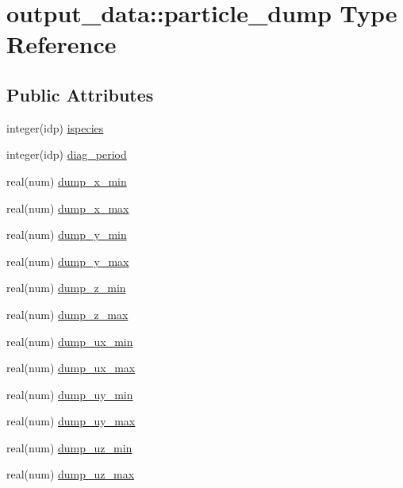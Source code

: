 \hypertarget{structoutput__data_1_1particle__dump}{}\section{output\+\_\+data\+:\+:particle\+\_\+dump Type Reference}
\label{structoutput__data_1_1particle__dump}
\subsection*{Public Attributes}
\begin{DoxyCompactItemize}
\item 
integer(idp) \hyperlink{structoutput__data_1_1particle__dump_add7490b6251f083595a221bead55a798}{ispecies}
\item 
integer(idp) \hyperlink{structoutput__data_1_1particle__dump_a2518cae3f0b8514002607d4c3848dbb7}{diag\+\_\+period}
\item 
real(num) \hyperlink{structoutput__data_1_1particle__dump_a79d5cc9dd03bf1aa1c49e864014fb87b}{dump\+\_\+x\+\_\+min}
\item 
real(num) \hyperlink{structoutput__data_1_1particle__dump_a810ba7ca647efaef4413e113755d922a}{dump\+\_\+x\+\_\+max}
\item 
real(num) \hyperlink{structoutput__data_1_1particle__dump_a4de965e6028bcd3bf64aa18e54e2603f}{dump\+\_\+y\+\_\+min}
\item 
real(num) \hyperlink{structoutput__data_1_1particle__dump_af9d54f7e6f448279ee61cf1ca25cf8df}{dump\+\_\+y\+\_\+max}
\item 
real(num) \hyperlink{structoutput__data_1_1particle__dump_a645012e22acb2681967acead28536d90}{dump\+\_\+z\+\_\+min}
\item 
real(num) \hyperlink{structoutput__data_1_1particle__dump_ab0f909037c7d69a16e199cace191cde3}{dump\+\_\+z\+\_\+max}
\item 
real(num) \hyperlink{structoutput__data_1_1particle__dump_aa246a6005e274b3684d96533ef1f89dc}{dump\+\_\+ux\+\_\+min}
\item 
real(num) \hyperlink{structoutput__data_1_1particle__dump_a19a7e2a23740ebd7c308f8efcd889ad1}{dump\+\_\+ux\+\_\+max}
\item 
real(num) \hyperlink{structoutput__data_1_1particle__dump_aa2b320996d6b74f1e2f0e3bfb012b018}{dump\+\_\+uy\+\_\+min}
\item 
real(num) \hyperlink{structoutput__data_1_1particle__dump_aa1df47b413842592057806858fc6744d}{dump\+\_\+uy\+\_\+max}
\item 
real(num) \hyperlink{structoutput__data_1_1particle__dump_a5a057e77c8dd4ce0a08244c202a8d472}{dump\+\_\+uz\+\_\+min}
\item 
real(num) \hyperlink{structoutput__data_1_1particle__dump_a78073b2357f7f1171f530797831a38a1}{dump\+\_\+uz\+\_\+max}
\end{DoxyCompactItemize}


